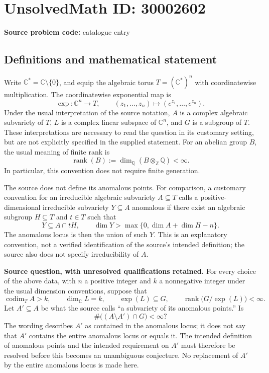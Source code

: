 \documentclass[11pt]{article}
\newcommand{\Z}{\mathbb{Z}}
\newcommand{\Q}{\mathbb{Q}}
\newcommand{\C}{\mathbb{C}}
\begin{document}
\section*{UnsolvedMath ID: 30002602}
\textbf{Source problem code:} catalogue entry
\subsection{Definitions and mathematical statement}
Write \(\C^*=\C\setminus\{0\}\), and equip the algebraic torus \(T=(\C^*)^n\) with coordinatewise multiplication. The coordinatewise exponential map is
\[
\exp\colon\C^n\longrightarrow T,\qquad (z_1,\ldots,z_n)\longmapsto(e^{z_1},\ldots,e^{z_n}).
\]
Under the usual interpretation of the source notation, \(A\) is a complex algebraic subvariety of \(T\), \(L\) is a complex linear subspace of \(\C^n\), and \(G\) is a subgroup of \(T\). These interpretations are necessary to read the question in its customary setting, but are not explicitly specified in the supplied statement. For an abelian group \(B\), the usual meaning of finite rank is
\[
\operatorname{rank}(B):=\dim_{\Q}(B\otimes_{\Z}\Q)<\infty.
\]
In particular, this convention does not require finite generation.

The source does not define its anomalous points. For comparison, a customary convention for an irreducible algebraic subvariety \(A\subseteq T\) calls a positive-dimensional irreducible subvariety \(Y\subseteq A\) anomalous if there exist an algebraic subgroup \(H\subseteq T\) and \(t\in T\) such that
\[
Y\subseteq A\cap tH,
\qquad
\dim Y>\max\{0,\dim A+\dim H-n\}.
\]
The anomalous locus is then the union of such \(Y\). This is an explanatory convention, not a verified identification of the source's intended definition; the source also does not specify irreducibility of \(A\).

\textbf{Source question, with unresolved qualifications retained.} For every choice of the above data, with \(n\) a positive integer and \(k\) a nonnegative integer under the usual dimension conventions, suppose that
\[
\operatorname{codim}_{T}A>k,\qquad
\dim_{\C}L=k,\qquad
\exp(L)\subseteq G,\qquad
\operatorname{rank}\bigl(G/\exp(L)\bigr)<\infty.
\]
Let \(A'\subseteq A\) be what the source calls ``a subvariety of its anomalous points.'' Is
\[
\#\bigl((A\setminus A')\cap G\bigr)<\infty?
\]
The wording describes \(A'\) as contained in the anomalous locus; it does not say that \(A'\) contains the entire anomalous locus or equals it. The intended definition of anomalous points and the intended requirement on \(A'\) must therefore be resolved before this becomes an unambiguous conjecture. No replacement of \(A'\) by the entire anomalous locus is made here.
\end{document}
